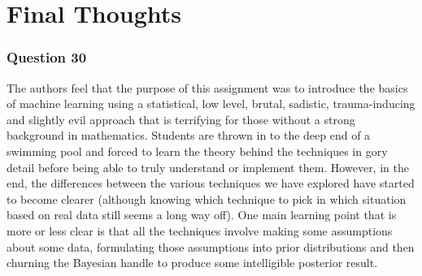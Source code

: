 \documentclass[10pt, a4paper, twocolumn]{article} %
\begin{document}
\section{Final Thoughts}
\subsubsection*{Question 30}
The authors feel that the purpose of this assignment was to introduce the basics of machine learning using a statistical, low level, brutal, sadistic, trauma-inducing and slightly evil approach that is terrifying for those without a strong background in mathematics. Students are thrown in to the deep end of a swimming pool and forced to learn the theory behind the techniques in gory detail before being able to truly understand or implement them. However, in the end, the differences between the various techniques we have explored have started to become clearer (although knowing which technique to pick in which situation based on real data still seems a long way off). One main learning point that is more or less clear is that all the techniques involve making some assumptions about some data, formulating those assumptions into prior distributions and then churning the Bayesian handle to produce some intelligible posterior result.


\printbibliography[title={Bibliography}] %

\end{document}
